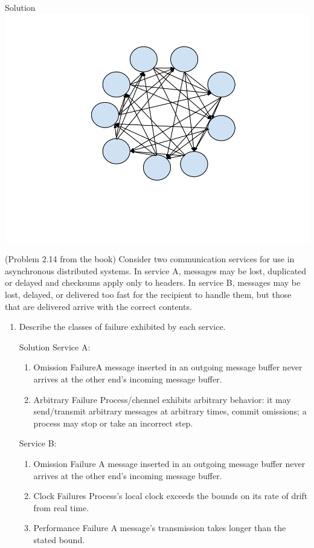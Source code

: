 \documentclass{article}
\begin{document}
\begin{spacing}{1.1}
\begin{homeworkProblem}
\begin{enumerate}[(1)]
\begin{homeworkSection}{Solution}
			\\ \includegraphics[width=\linewidth]{prob1Bans.png}
			\end{homeworkSection}
	\end{enumerate}
\end{homeworkProblem}
\newpage
\begin{homeworkProblem}
	(Problem 2.14 from the book) Consider two communication services for use in asynchronous distributed systems. In service A, messages may be lost, duplicated or delayed and checksums apply only to headers. In service B, messages may be lost, delayed, or delivered too fast for the recipient to handle them, but those that are delivered arrive with the correct contents.
	\begin{enumerate}[(1)]
		\item Describe the classes of failure exhibited by each service.
			\begin{homeworkSection}{Solution}
				Service A:
					\begin{enumerate}
						\item Omission FailureA message inserted in an outgoing message buffer never arrives at the other end's incoming message buffer.
						\item Arbitrary Failure Process/chennel exhibits arbitrary behavior: it may send/transmit arbitrary messages at arbitrary times, commit omissions; a process may stop or take an incorrect step.
					\end{enumerate}  
				Service B:	
					\begin{enumerate}	
						\item Omission Failure A message inserted in an outgoing message buffer never arrives at the other end's incoming message buffer.
						\item Clock Failures Process's local clock exceeds the bounds on its rate of drift from real time.
						\item Performance Failure A message's transmission takes longer than the stated bound.
					\end{enumerate}
					

\end{homeworkSection}
\end{enumerate}
\end{homeworkProblem}
\end{spacing}
\end{document}
